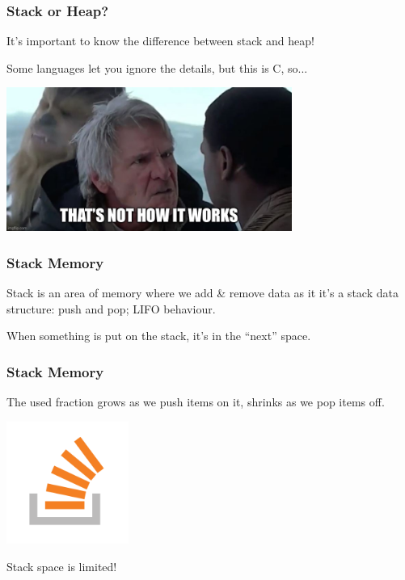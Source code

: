 \begin{frame}
\frametitle{Stack or Heap?}

It's important to know the difference between stack and heap!

Some languages let you ignore the details, but this is C, so...

\begin{center}
  \includegraphics[width=0.7\textwidth]{images/nothowitworks.jpg}
\end{center}

\end{frame}

\begin{frame}
\frametitle{Stack Memory}

Stack is an area of memory where we add \& remove data as it it's a stack data structure: push and pop; LIFO behaviour.

When something is put on the stack, it's in the ``next'' space.

\end{frame}

\begin{frame}
\frametitle{Stack Memory}

The used fraction grows as we push items on it, shrinks as we pop items off.

\begin{center}
  \includegraphics[width=0.3\textwidth]{images/stackoverflow.png}
\end{center}

Stack space is limited! 

\end{frame}


